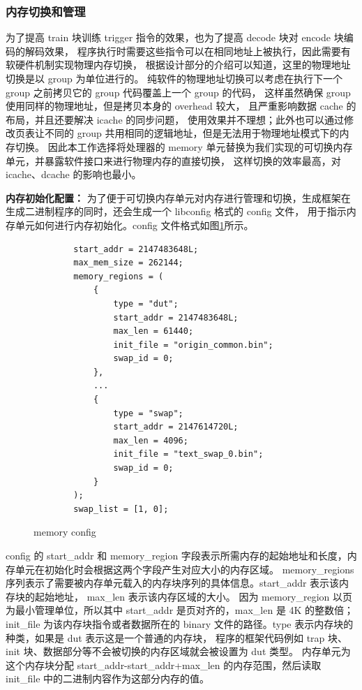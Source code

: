 \subsubsection{内存切换和管理}
为了提高 train 块训练 trigger 指令的效果，也为了提高 decode 块对 encode 块编码的解码效果，
程序执行时需要这些指令可以在相同地址上被执行，因此需要有软硬件机制实现物理内存切换，
根据设计部分的介绍可以知道，这里的物理地址切换是以 group 为单位进行的。
纯软件的物理地址切换可以考虑在执行下一个 group 之前拷贝它的 group 代码覆盖上一个 group 的代码，
这样虽然确保 group 使用同样的物理地址，但是拷贝本身的 overhead 较大，
且严重影响数据 cache 的布局，并且还要解决 icache 的同步问题，
使用效果并不理想；此外也可以通过修改页表让不同的 group 共用相同的逻辑地址，但是无法用于物理地址模式下的内存切换。
因此本工作选择将处理器的 memory 单元替换为我们实现的可切换内存单元，并暴露软件接口来进行物理内存的直接切换，
这样切换的效率最高，对 icache、dcache 的影响也最小。\par

\textbf{内存初始化配置：}
为了便于可切换内存单元对内存进行管理和切换，生成框架在生成二进制程序的同时，还会生成一个 libconfig 格式的 config 文件，
用于指示内存单元如何进行内存初始化。config 文件格式如图\ref{code:memory-config}所示。\par

\begin{figure}[htbp]
    \centering
    \begin{verbatim}
        start_addr = 2147483648L;
        max_mem_size = 262144;
        memory_regions = (
            {
                type = "dut";
                start_addr = 2147483648L;
                max_len = 61440;
                init_file = "origin_common.bin";
                swap_id = 0;
            },
            ...
            {
                type = "swap";
                start_addr = 2147614720L;
                max_len = 4096;
                init_file = "text_swap_0.bin";
                swap_id = 0;
            }
        );
        swap_list = [1, 0];
    \end{verbatim}
    \caption{memory config}
    \label{code:memory-config}
\end{figure}

config 的 start\_addr 和 memory\_region 字段表示所需内存的起始地址和长度，内存单元在初始化时会根据这两个字段产生对应大小的内存区域。
memory\_regions 序列表示了需要被内存单元载入的内存块序列的具体信息。start\_addr 表示该内存块的起始地址，
max\_len 表示该内存区域的大小。
因为 memory\_region 以页为最小管理单位，所以其中 start\_addr 是页对齐的，max\_len 是 4K 的整数倍；
init\_file 为该内存块指令或者数据所在的 binary 文件的路径。type 表示内存块的种类，如果是 dut 表示这是一个普通的内存块，
程序的框架代码例如 trap 块、init 块、数据部分等不会被切换的内存区域就会被设置为 dut 类型。
内存单元为这个内存块分配 start\_addr-start\_addr+max\_len 的内存范围，然后读取 init\_file 中的二进制内容作为这部分内存的值。\par


